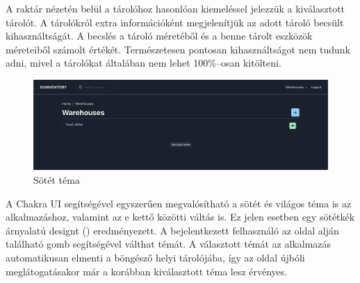 A raktár nézetén belül a tárolóhoz hasonlóan kiemeléssel jelezzük a kiválasztott tárolót.
A tárolókról extra információként megjelenítjük az adott tároló becsült kihasználtságát.
A becslés a tároló méretéből és a benne tárolt eszközök méreteiből számolt értékét.
Természetesen pontosan kihasználtságot nem tudunk adni, mivel a tárolókat általában nem lehet 100\%–osan kitölteni.

\begin{figure}[!ht]
  \centering
  \includegraphics[width=150mm, keepaspectratio]{figures/dark_mode.png}
  \caption{Sötét téma}
  \label{fig:darkMode}
\end{figure}
A Chakra UI segítségével egyszerűen megvalósítható a sötét és világos téma is az alkalmazáshoz, valamint az e kettő közötti váltás is.
Ez jelen esetben egy sötétkék árnyalatú designt () eredményezett. 
A bejelentkezett felhasználó az oldal alján található gomb segítségével válthat témát.
A választott témát az alkalmazás automatikusan elmenti a böngésző helyi tárolójába, így az oldal újbóli meglátogatásakor már a korábban kiválasztott téma lesz érvényes.


